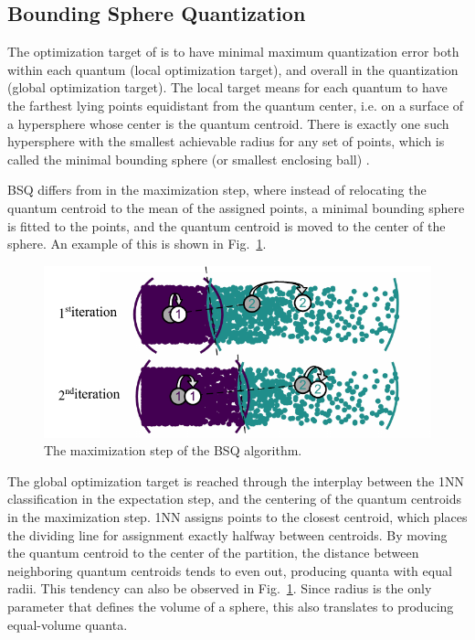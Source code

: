 		\subsection{Bounding Sphere Quantization}
			
			The optimization target of  is to have minimal maximum quantization error both within each quantum (local optimization target), and overall in the quantization (global optimization target).
			The local target means for each quantum to have the farthest lying points equidistant from the quantum center, i.e. on a surface of a hypersphere whose center is the quantum centroid.
			There is exactly one such hypersphere with the smallest achievable radius for any set of points, which is called the minimal bounding sphere (or smallest enclosing ball) \cite{sebdef}.
			
			\ac{BSQ} differs from \kmeans{} in the maximization step, where instead of relocating the quantum centroid to the mean of the assigned points, a minimal bounding sphere is fitted to the points, and the quantum centroid is moved to the center of the sphere.
			An example of this is shown in Fig.~\ref{fig:bsqmax}.
			
			\begin{figure}[ht]
				\centering
				\includegraphics[width=0.7\linewidth]{figures/03_quantization/bsq_step/bsq_step.pdf}
				\caption[BSQ maximization step]{The maximization step of the BSQ algorithm.}
				\label{fig:bsqmax}
			\end{figure}
			
			The global optimization target is reached through the interplay between the \ac{1NN} classification in the expectation step, and the centering of the quantum centroids in the maximization step.
			\ac{1NN} assigns points to the closest centroid, which places the dividing line for assignment exactly halfway between centroids.
			By moving the quantum centroid to the center of the partition, the distance between neighboring quantum centroids tends to even out, producing quanta with equal radii. This tendency can also be observed in Fig.~\ref{fig:bsqmax}.
			Since radius is the only parameter that defines the volume of a sphere, this also translates to producing equal-volume quanta.
			
